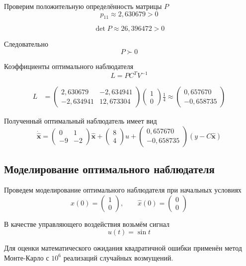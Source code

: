 Проверим положительную определённость матрицы $P$
\[
p_{11}\approx2{,}630679>0
\]

\[
\det P\approx26{,}396472>0
\]

Следовательно
\[
P\succ0
\]

Коэффициенты оптимального наблюдателя
\[
L=PC^TV^{-1}
\]

\[
\begin{aligned}
L
&=
\begin{pmatrix}
2{,}630679&-2{,}634941\\
-2{,}634941&12{,}673304
\end{pmatrix}
\begin{pmatrix}1\\0\end{pmatrix}
\frac14\approx
\begin{pmatrix}
0{,}657670\\
-0{,}658735
\end{pmatrix}
\end{aligned}
\]

Полученный оптимальный наблюдатель имеет вид
\[
\dot{\hat{\bm x}}=
\begin{pmatrix}0&1\\-9&-2\end{pmatrix}
\hat{\bm x}
+
\begin{pmatrix}8\\4\end{pmatrix}u
+
\begin{pmatrix}
0{,}657670\\-0{,}658735
\end{pmatrix}
(y-C\hat{\bm x})
\]

\subsection{Моделирование оптимального наблюдателя}

Проведем моделирование оптимального наблюдателя при начальных условиях
\[
x(0)=\begin{pmatrix}1\\0\end{pmatrix},
\qquad
\hat{x}(0)=\begin{pmatrix}0\\0\end{pmatrix}
\]

В качестве управляющего воздействия возьмём сигнал
\[
u(t)=\sin t
\]

Для оценки математического ожидания квадратичной ошибки применён метод Монте-Карло с $10^6$ реализаций случайных возмущений.

